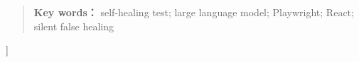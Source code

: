 \documentclass[UTF8, a4paper, 10.5pt, twocolumn, fontset=none]{ctexart}
\begin{document}
\begin{@twocolumnfalse}
\begin{quote}
  \vspace{2pt}
  \noindent\textbf{Key words：} self-healing test; large language model; Playwright; React; silent false healing

  \vspace{6pt}
  \end{quote}
  \end{@twocolumnfalse}
]

\begingroup
\renewcommand{\thefootnote}{}
\endgroup
\setcounter{footnote}{0}

\setcounter{section}{-1}








\end{document}
